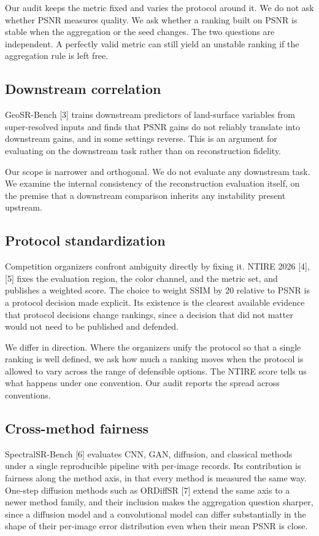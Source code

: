 \documentclass[journal,twoside,10pt]{IEEEtran}
\begin{document}
Our audit keeps the metric fixed and varies the protocol around it. We do not ask whether PSNR measures quality. We ask whether a ranking built on PSNR is stable when the aggregation or the seed changes. The two questions are independent. A perfectly valid metric can still yield an unstable ranking if the aggregation rule is left free.

\subsection{Downstream correlation}


GeoSR-Bench [3] trains downstream predictors of land-surface variables from super-resolved inputs and finds that PSNR gains do not reliably translate into downstream gains, and in some settings reverse. This is an argument for evaluating on the downstream task rather than on reconstruction fidelity.

Our scope is narrower and orthogonal. We do not evaluate any downstream task. We examine the internal consistency of the reconstruction evaluation itself, on the premise that a downstream comparison inherits any instability present upstream.

\subsection{Protocol standardization}


Competition organizers confront ambiguity directly by fixing it. NTIRE 2026 [4], [5] fixes the evaluation region, the color channel, and the metric set, and publishes a weighted score. The choice to weight SSIM by 20 relative to PSNR is a protocol decision made explicit. Its existence is the clearest available evidence that protocol decisions change rankings, since a decision that did not matter would not need to be published and defended.

We differ in direction. Where the organizers unify the protocol so that a single ranking is well defined, we ask how much a ranking moves when the protocol is allowed to vary across the range of defensible options. The NTIRE score tells us what happens under one convention. Our audit reports the spread across conventions.

\subsection{Cross-method fairness}


SpectralSR-Bench [6] evaluates CNN, GAN, diffusion, and classical methods under a single reproducible pipeline with per-image records. Its contribution is fairness along the method axis, in that every method is measured the same way. One-step diffusion methods such as ORDiffSR [7] extend the same axis to a newer method family, and their inclusion makes the aggregation question sharper, since a diffusion model and a convolutional model can differ substantially in the shape of their per-image error distribution even when their mean PSNR is close.
\end{document}
